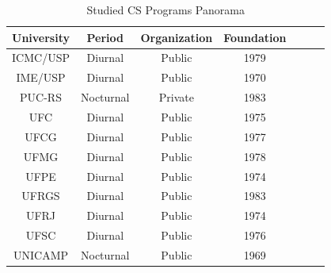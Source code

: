 \documentclass{beamer}
\begin{document}
\begin{frame}
\begin{table}
	\scriptsize
	\caption{Studied CS Programs Panorama}
    \begin{tabular}{|c|c|c|c|c|c|c|}
        \hline
        University  & Period    & Organization & Foundation   \\ \hline
        \rowcolor[gray]{.8}
        ICMC/USP    & Diurnal   & Public       & 1979         \\ 
        \rowcolor[gray]{.8}
        IME/USP     & Diurnal   & Public       & 1970         \\ 
        PUC-RS      & Nocturnal & Private      & 1983         \\ 
        UFC         & Diurnal   & Public       & 1975         \\ 
        UFCG        & Diurnal   & Public       & 1977         \\ 
        UFMG        & Diurnal   & Public       & 1978         \\ 
        UFPE        & Diurnal   & Public       & 1974         \\ 
        UFRGS       & Diurnal   & Public       & 1983         \\ 
        \rowcolor[gray]{.8}
        UFRJ        & Diurnal   & Public       & 1974         \\ 
        UFSC        & Diurnal   & Public       & 1976         \\ 
        UNICAMP     & Nocturnal & Public       & 1969         \\
        \hline
    \end{tabular}
\end{table}
\end{frame}
\end{document}
